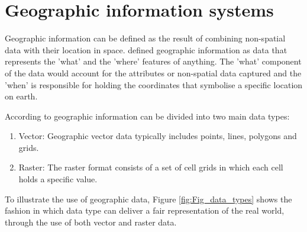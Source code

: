 \documentclass[12pt, a4paper]{report}
\begin{document}





\section{Geographic information systems}

Geographic information can be defined as the result of combining non-spatial data with their location in space. \cite{longleyGeographicInformationScience2015} defined geographic information as data that represents the 'what' and the 'where' features of anything. The 'what' component of the data would account for the attributes or non-spatial data captured and the 'when' is responsible for holding the coordinates that symbolise a specific location on earth.

According to \cite{maclachlanAppliedGeographicInformation2022} geographic information can be divided into two main data types:

\begin{enumerate}
  \item Vector: Geographic vector data typically includes points, lines, polygons and grids.
  \item Raster: The raster format consists of a set of cell grids in which each cell holds a specific value. 
\end{enumerate}

To illustrate the use of geographic data, Figure \ref{fig:Fig_data_types} shows the fashion in which data type can deliver a fair representation of the real world, through the use of both vector and raster data.
\end{document}

